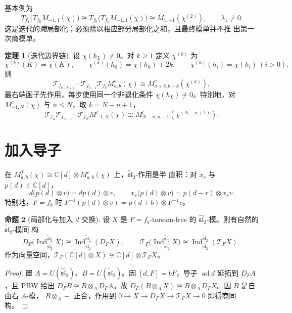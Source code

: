 \documentclass[UTF8,11pt]{ctexart}
\newcommand{\C}{\mathbb C}
\newcommand{\slh}{\widehat{\mathfrak{sl}}_2}
\newcommand{\slt}{\widetilde{\mathfrak{sl}}_2}
\newcommand{\ad}{\operatorname{ad}}
\newcommand{\Ind}{\operatorname{Ind}}
\newcommand{\T}{\mathcal T}
\theoremstyle{definition}
\newtheorem{proposition}{命题}[section]
\newtheorem{theorem}[proposition]{定理}
\begin{document}
基本例为
\[
T_{f_1}\bigl(T_{f_0}M_{-1,1}(\chi)\bigr)
\cong T_{f_0}\bigl(T_{f_1}M_{-1,1}(\chi)\bigr)
\cong M_{1,-1}(\chi^{(2)}),\qquad \lambda_1\ne0.
\]
这是迭代的\emph{商}局部化；必须除以相应部分局部化之和，且最终模单并不推
出第一次商模单。

\begin{theorem}[迭代边界链]\label{thm:iterated}
设 \(\chi(h_L)\ne0\)。对 \(k\ge1\) 定义 \(\chi^{(k)}\) 为
\[
\chi^{(k)}(K)=\chi(K),\qquad
\chi^{(k)}(h_0)=\chi(h_0)+2k,\qquad
\chi^{(k)}(h_i)=\chi(h_i)\ (i>0).
\]
则
\begin{equation}\label{eq:iterated}
\boxed{\ \T_{f_{b-k+1}}\cdots\T_{f_{b-1}}\T_{f_b}
M^c_{a,b}(\chi)\cong M^c_{a+k,b-k}(\chi^{(k)}),\ }
\end{equation}
最右端函子先作用，每步使用同一个非退化条件 \(\chi(h_L)\ne0\)。特别地，对
\(M^c_{-1,N}(\chi)\) 与 \(n\le N\)，取 \(k=N-n+1\)，
\begin{equation}\label{eq:iterated-special}
\boxed{\ \T_{f_n}\T_{f_{n+1}}\cdots\T_{f_N}
M^c_{-1,N}(\chi)\cong M^c_{N-n,n-1}(\chi^{(N-n+1)}).\ }
\end{equation}
\end{theorem}

\section{加入导子}\label{sec:derivation}

在 \(M^f_{a,b}(\chi)\cong\C[d]\otimes M^c_{a,b}(\chi)\) 上，\(\slt\)-作用是半
直积：对 \(x_r\) 与 \(p(d)\in\C[d]\)，
\[
d\bigl(p(d)\otimes v\bigr)=dp(d)\otimes v,\qquad
x_r\bigl(p(d)\otimes v\bigr)=p(d-r)\otimes x_rv.
\]
特别地，\(F=f_b\) 时
\(F^{-1}(p(d)\otimes v)=p(d+b)\otimes F^{-1}v\)。

\begin{proposition}[局部化与加入 \(d\) 交换]\label{prop:loc-induction}
设 \(X\) 是 \(F=f_b\)-torsion-free 的 \(\slh\)-模。则有自然的 \(\slt\)-模同
构
\[
D_F\bigl(\Ind_{\slh}^{\slt}X\bigr)\cong\Ind_{\slh}^{\slt}(D_FX),
\qquad
\boxed{\ \T_F\bigl(\Ind_{\slh}^{\slt}X\bigr)\cong\Ind_{\slh}^{\slt}(\T_FX).\ }
\]
作为向量空间，\(\T_F(\C[d]\otimes X)\cong\C[d]\otimes\T_FX\)。
\end{proposition}

\begin{proof}
置 \(A=U(\slh)\)、\(B=U(\slt)\)。因 \([d,F]=bF\)，导子 \(\ad d\) 延拓到
\(D_FA\)，且 PBW 给出 \(D_FB\cong B\otimes_AD_FA\)。故
\(D_F(B\otimes_AX)\cong B\otimes_AD_FX\)。因 \(B\) 是自由右 \(A\)-模，
\(B\otimes_A-\) 正合，作用到 \(0\to X\to D_FX\to\T_FX\to0\) 即得商同构。
\end{proof}
\end{document}
